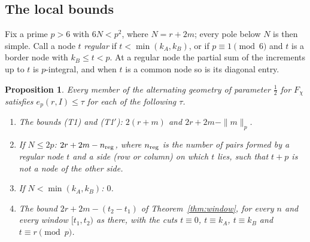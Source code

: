 \documentclass[11pt]{amsart}
\newtheorem{proposition}[theorem]{Proposition}
\theoremstyle{definition}
\theoremstyle{remark}
\numberwithin{equation}{section}
\begin{document}
\subsection{The local bounds}
Fix a prime $p>6$ with $6N<p^2$, where $N=r+2m$; every pole below $N$ is then simple. Call a node $t$ \emph{regular} if
$t<\min(k_A,k_B)$, or if $p\equiv1\pmod6$ and $t$ is a border node with $k_B\le t<p$. At a regular node the partial sum
of the increments up to $t$ is $p$-integral, and when $t$ is a common node so is its diagonal entry.

\begin{proposition}\label{prop:chi3-local}
Every member of the alternating geometry of parameter $\frac12$ for $F_\chi$ satisfies $e_p(r,I)\le\tau$ for each of the
following $\tau$.
\begin{enumerate}[label=(\roman*),leftmargin=*]
\item The bounds (T1) and (T1$'$): $2(r+m)$ and $2r+2m-\|m\|_p$.
\item If $N\le2p$: $2r+2m-n_{\rm reg}$, where $n_{\rm reg}$ is the number of pairs formed by a regular node $t$ and a side
 (row or column) on which $t$ lies, such that $t+p$ is not a node of the other side.
\item If $N<\min(k_A,k_B)$: $0$.
\item The bound $2r+2m-(t_2-t_1)$ of Theorem~\ref{thm:window}, for every $n$ and every window $[t_1,t_2)$ as there, with the
 cuts $t\equiv0$, $t\equiv k_A$, $t\equiv k_B$ and $t\equiv r\pmod p$.
\end{enumerate}
\end{proposition}
\end{document}
